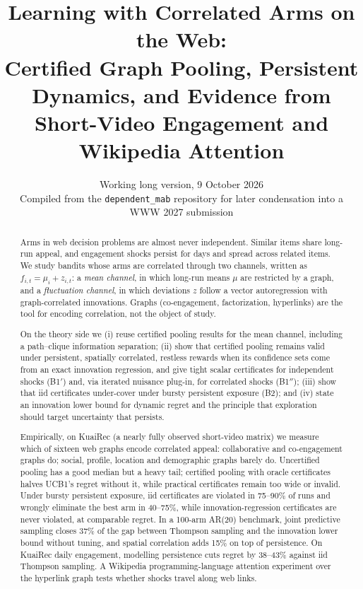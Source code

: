 \documentclass[11pt]{article}
\title{Learning with Correlated Arms on the Web:\\
Certified Graph Pooling, Persistent Dynamics, and Evidence from\\ Short-Video Engagement and Wikipedia Attention}
\author{Working long version, 9 October 2026\\
\small Compiled from the \texttt{dependent\_mab} repository for later condensation into a WWW 2027 submission}
\date{}
\theoremstyle{definition}
\theoremstyle{remark}
\begin{document}
\maketitle

\begin{abstract}
Arms in web decision problems are almost never independent. Similar items share long-run appeal, and engagement shocks persist for days and spread across related items. We study bandits whose arms are correlated through two channels, written as $f_{i,t}=\mu_i+z_{i,t}$: a \emph{mean channel}, in which long-run means $\mu$ are restricted by a graph, and a \emph{fluctuation channel}, in which deviations $z$ follow a vector autoregression with graph-correlated innovations. Graphs (co-engagement, factorization, hyperlinks) are the tool for encoding correlation, not the object of study.

On the theory side we (i) reuse certified pooling results for the mean channel, including a path--clique information separation; (ii) show that certified pooling remains valid under persistent, spatially correlated, restless rewards when its confidence sets come from an exact innovation regression, and give tight scalar certificates for independent shocks (B1$'$) and, via iterated nuisance plug-in, for correlated shocks (B1$''$); (iii) show that iid certificates under-cover under bursty persistent exposure (B2); and (iv) state an innovation lower bound for dynamic regret and the principle that exploration should target uncertainty that persists.

Empirically, on KuaiRec (a nearly fully observed short-video matrix) we measure which of sixteen web graphs encode correlated appeal: collaborative and co-engagement graphs do; social, profile, location and demographic graphs barely do. Uncertified pooling has a good median but a heavy tail; certified pooling with oracle certificates halves UCB1's regret without it, while practical certificates remain too wide or invalid. Under bursty persistent exposure, iid certificates are violated in 75--90\% of runs and wrongly eliminate the best arm in 40--75\%, while innovation-regression certificates are never violated, at comparable regret. In a 100-arm AR(20) benchmark, joint predictive sampling closes 37\% of the gap between Thompson sampling and the innovation lower bound without tuning, and spatial correlation adds 15\% on top of persistence. On KuaiRec daily engagement, modelling persistence cuts regret by 38--43\% against iid Thompson sampling. A Wikipedia programming-language attention experiment over the hyperlink graph tests whether shocks travel along web links.
\end{abstract}
\end{document}
